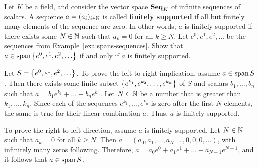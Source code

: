 \begin{ex}
  Let $K$ be a field, and consider the vector space $\mathbf{Seq}_K$ of
  infinite sequences of scalars.  A sequence $a=(a_i)_{i\in\mathbb{N}}$ is
  called \textbf{finitely supported}%
   if all but finitely many
  elements of the sequence are zero. In other words, $a$ is finitely
  supported if there exists some $N\in\mathbb{N}$ such that $a_k=0$ for all
  $k\geq N$.  Let $e^0,e^1,e^2,\ldots$ be the sequences from
  Example~\ref{exa:spans-sequences}.  Show that
  $a\in\sspan\set{e^0,e^1,e^2,\ldots}$ if and only if $a$ is finitely
  supported.
  \begin{sol}
    Let $S=\left\{e^0,e^1,e^2,\ldots\right\}$. To prove the left-to-right
    implication, assume $a\in\sspan S$. Then there exists some finite
    subset $\left\{e^{k_1},e^{k_2},\ldots,e^{k_n}\right\}$ of $S$ and scalars
    $b_1,\ldots,b_n$ such that $a = b_1e^{k_1} + \ldots + b_ne^{k_n}$.
    Let $N\in\mathbb{N}$ be a number that is greater than $k_1,\ldots,k_n$.
    Since each of the sequences $e^{k_1},\ldots,e^{k_n}$ is zero after
    the first $N$ elements, the same is true for their linear
    combination $a$. Thus, $a$ is finitely supported.

    To prove the right-to-left direction, assume $a$ is finitely
    supported. Let $N\in\mathbb{N}$ such that $a_k=0$ for all $k\geq N$.  Then
    $a = (a_0,a_1,\ldots,a_{N-1},0,0,0,\ldots)$, with infinitely many
    zeros following. Therefore,
    $a = a_0e^0 + a_1e^1 + \ldots + a_{N-1}e^{N-1}$, and it follows
    that $a\in\sspan S$.
  \end{sol}
\end{ex}
